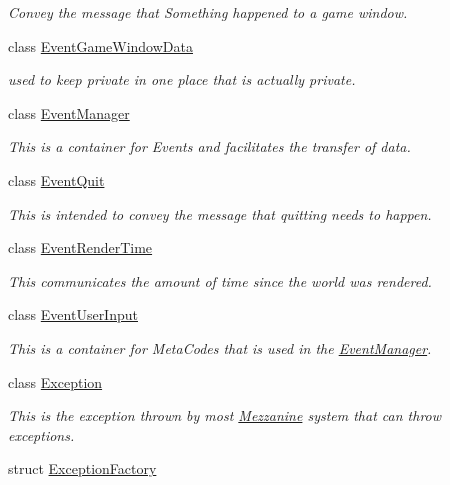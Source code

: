 \begin{DoxyCompactItemize}
\begin{DoxyCompactList}\small\item\em Convey the message that Something happened to a game window. \end{DoxyCompactList}\item 
class \hyperlink{classMezzanine_1_1EventGameWindowData}{Event\-Game\-Window\-Data}
\begin{DoxyCompactList}\small\item\em used to keep private in one place that is actually private. \end{DoxyCompactList}\item 
class \hyperlink{classMezzanine_1_1EventManager}{Event\-Manager}
\begin{DoxyCompactList}\small\item\em This is a container for Events and facilitates the transfer of data. \end{DoxyCompactList}\item 
class \hyperlink{classMezzanine_1_1EventQuit}{Event\-Quit}
\begin{DoxyCompactList}\small\item\em This is intended to convey the message that quitting needs to happen. \end{DoxyCompactList}\item 
class \hyperlink{classMezzanine_1_1EventRenderTime}{Event\-Render\-Time}
\begin{DoxyCompactList}\small\item\em This communicates the amount of time since the world was rendered. \end{DoxyCompactList}\item 
class \hyperlink{classMezzanine_1_1EventUserInput}{Event\-User\-Input}
\begin{DoxyCompactList}\small\item\em This is a container for Meta\-Codes that is used in the \hyperlink{classMezzanine_1_1EventManager}{Event\-Manager}. \end{DoxyCompactList}\item 
class \hyperlink{classMezzanine_1_1Exception}{Exception}
\begin{DoxyCompactList}\small\item\em This is the exception thrown by most \hyperlink{namespaceMezzanine}{Mezzanine} system that can throw exceptions. \end{DoxyCompactList}\item 
struct \hyperlink{structMezzanine_1_1ExceptionFactory}{Exception\-Factory}

\end{DoxyCompactItemize}
